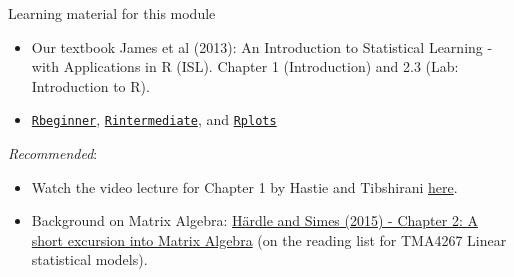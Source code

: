 \documentclass[10pt,ignorenonframetext,]{beamer}
\begin{document}
\begin{frame}

\begin{block}{Learning material for this module}

\begin{itemize}
\item
  Our textbook James et al (2013): An Introduction to Statistical
  Learning - with Applications in R (ISL). Chapter 1 (Introduction) and
  2.3 (Lab: Introduction to R).
\item
  \href{https://htmlpreview.github.io/?https://github.com/stefaniemuff/statlearning/blob/master/Exercise1/Rbeginner.html}{\texttt{Rbeginner}},
  \href{https://htmlpreview.github.io/?https://github.com/stefaniemuff/statlearning/blob/master/Exercise1/Rintermediate.html}{\texttt{Rintermediate}},
  and
  \href{https://htmlpreview.github.io/?https://github.com/stefaniemuff/statlearning/blob/master/Exercise1/Rplots.html}{\texttt{Rplots}}
\end{itemize}

\vspace{3mm}

\emph{Recommended}:

\begin{itemize}
\item
  Watch the video lecture for Chapter 1 by Hastie and Tibshirani
  \href{https://www.r-bloggers.com/in-depth-introduction-to-machine-learning-in-15-hours-of-expert-videos/}{here}.
\item
  Background on Matrix Algebra:
  \href{https://link.springer.com/chapter/10.1007/978-3-662-45171-7_2}{Härdle
  and Simes (2015) - Chapter 2: A short excursion into Matrix Algebra}
  (on the reading list for TMA4267 Linear statistical models).
\end{itemize}

\end{block}

\end{frame}
\end{document}
